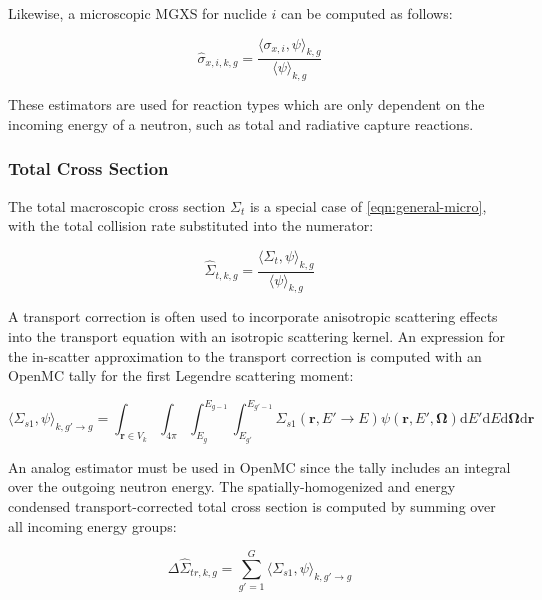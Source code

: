 \noindent Likewise, a microscopic MGXS for nuclide $i$ can be computed as follows:

\begin{equation}
\label{eqn:general-micro}
\hat{\sigma}_{x,i,k,g} = \frac{\langle \sigma_{x,i}, \psi \rangle_{k,g}}{\langle \psi \rangle_{k,g}}
\end{equation}

These estimators are used for reaction types which are only dependent on the incoming energy of a neutron, such as total and radiative capture reactions.

\subsubsection{Total Cross Section}
\label{subsubsec:tally-types-tot-xs}

The total macroscopic cross section $\Sigma_{t}$ is a special case of \autoref{eqn:general-micro}, with the total collision rate substituted into the numerator:

\begin{equation}
\label{eqn:total-macro}
\hat{\Sigma}_{t,k,g} = \frac{\langle \Sigma_{t}, \psi \rangle_{k,g}}{\langle \psi \rangle_{k,g}}
\end{equation}

A transport correction is often used to incorporate anisotropic scattering effects into the transport equation with an isotropic scattering kernel. An expression for the in-scatter approximation \cite{yamamoto2008simplified} to the transport correction is computed with an OpenMC tally for the first Legendre scattering moment:

\begin{equation}
\label{eqn:sigs1}
\langle \Sigma_{s1}, \psi \rangle_{k,g'\rightarrow g} = \int_{\mathbf{r} \in V_{k}} \int_{4\pi} \int_{E_{g}}^{E_{g-1}} \int_{E_{g'}}^{E_{g'-1}} \Sigma_{s1}(\mathbf{r},E'\rightarrow E)\psi(\mathbf{r},E',\mathbf{\Omega}) \mathrm{d}E'\mathrm{d}E\mathrm{d}\mathbf{\Omega}\mathrm{d}\mathbf{r}
\end{equation}

\noindent An analog estimator must be used in OpenMC since the tally includes an integral over the outgoing neutron energy. The spatially-homogenized and energy condensed transport-corrected total cross section is computed by summing over all incoming energy groups:

\begin{equation}
\label{eqn:transport-corr-macro}
\Delta\hat{\Sigma}_{tr,k,g} = \displaystyle\sum\limits_{g'=1}^{G} \langle{\Sigma_{s1}, \psi \rangle_{k,g'\rightarrow g}}
\end{equation}

